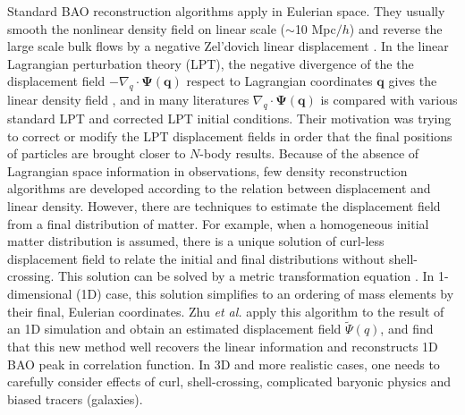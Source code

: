 \documentclass[aps,prd,twocolumn,superscriptaddress,amsfont,amssymb,amsmath,nofootinbib,showpacs,balancelastpage]{revtex4-1}
\newcommand{\bs}{\boldsymbol}
\begin{document}
Standard BAO reconstruction algorithms apply in Eulerian space.
They usually smooth the nonlinear density field on
linear scale ($\sim$10 Mpc$/h$) and reverse the large 
scale bulk flows by a negative Zel'dovich linear displacement
\citep{2007ApJ...664..675E,2009PhRvD..80l3501N,2009PhRvD..79f3523P}.
In the linear Lagrangian perturbation theory (LPT), the 
negative divergence of the the displacement field
$-\nabla_q\cdot\bs\Psi(\bs q)$ respect to Lagrangian coordinates $\bs q$
gives the linear density field \citep{2010PhDT.........4J},
and in many literatures
\cite{2013MNRAS.428..141N,2014PhRvD..89h3515C,2016JCAP...03..017B}
$\nabla_q\cdot\bs\Psi(\bs q)$ is compared with various standard LPT
and corrected LPT initial conditions. Their motivation was
trying to correct or modify the LPT displacement fields
in order that the final positions of particles are brought
closer to $N$-body results. Because of the absence
of Lagrangian space information in observations, few density
reconstruction algorithms are developed according to the relation
between displacement and linear density. However,
there are techniques to estimate the displacement field from a final 
distribution of matter.
For example, when a homogeneous initial matter distribution 
is assumed, there is a unique solution of curl-less displacement field to relate 
the initial and final distributions without shell-crossing. This solution can be 
solved by a metric transformation equation
\citep{1995ApJS..100..269P,1998ApJS..115...19P}.
In 1-dimensional (1D) case, this solution 
simplifies to an ordering of mass elements by their final, Eulerian coordinates.
Zhu {\it et al.} \cite{2016arXiv160907041Z} apply this algorithm to the result
of an 1D simulation \citep{2016JCAP...01..043M} and obtain an estimated
displacement field $\tilde\Psi(q)$, and find
that this new method well recovers the linear
information and reconstructs 1D BAO peak in correlation function.
In 3D and more realistic cases, one needs to
carefully consider effects of curl, shell-crossing, 
complicated baryonic physics and biased tracers (galaxies).
\end{document}
